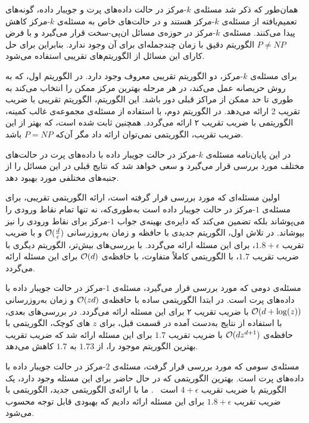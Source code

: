 
همان‌طور که ذکر شد مسئله‌ی $k$-مرکز در حالت داده‌های پرت و جویبار داده، گونه‌های تعمیم‌یافته از مسئله‌ی $k$-مرکز هستند و در حالت‌های خاص به مسئله‌ی $k$-مرکز کاهش پیدا می‌کنند.
مسئله‌ی $k$-مرکز در حوزه‌ی مسائل ان‌پی-سخت قرار می‌گیرد و با فرض $P \neq NP$ الگوریتم دقیق با زمان چندجمله‌ای برای آن وجود ندارد.
بنابراین برای حل کارای این مسائل از الگوریتم‌های تقریبی استفاده می‌شود.

برای مسئله‌ی $k$-مرکز، دو الگوریتم تقریبی معروف وجود دارد.
در الگوریتم اول، که به روش حریصانه عمل می‌کند، در هر مرحله بهترین مرکز ممکن را انتخاب می‌کند به طوری تا حد ممکن از مراکز قبلی دور باشد.
این الگوریتم، الگوریتم تقریبی با ضریب تقریب 2 ارائه می‌دهد.
در الگوریتم دوم، با استفاده از مسئله‌ی مجموعه‌ی غالب کمینه، الگوریتمی با ضریب تقریب ۲ ارائه می‌گردد.
همچنین ثابت شده است، که بهتر از این ضریب تقریب، الگوریتمی نمی‌توان ارائه داد مگر آن‌که $P = NP$ باشد.


در این پایان‌نامه مسئله‌ی $k$-مرکز  در حالت جویبار داده با داده‌های پرت در حالت‌های مختلف مورد بررسی قرار می‌گیرد و سعی خواهد شد که نتایج قبلی در این مسائل را از جنبه‌های مختلفی مورد بهبود دهد.

اولین مسئله‌ای که مورد بررسی قرار گرفته است، ارائه الگوریتمی تقریبی، برای مسئله‌ی $1$-مرکز در حالت جویبار داده است به‌طوری‌که، نه تنها تمام نقاط ورودی را می‌پوشاند بلکه تضمین می‌کند که دایره‌ی بهینه‌ی جواب $1$-مرکز برای نقاط ورودی را نیز بپوشاند.
در تلاش اول، الگوریتم جدیدی با حافظه و زمان به‌روزرسانی $\mathcal{O}(\frac{d}{\epsilon})$ و با ضریب تقریب $1.8 + \epsilon$، برای این مسئله ارائه می‌گردد.
با بررسی‌های بیش‌تر، الگوریتم دیگری با ضریب تقریب $1.7$، با الگوریتمی کاملاً متفاوت، با حافظه‌ی $\mathcal{O}(d)$ برای این مسئله ارائه می‌گردد.

مسئله‌ی دومی که مورد بررسی قرار می‌گیرد، مسئله‌ی $1$-مرکز در حالت جویبار داده با داده‌های پرت است.
در ابتدا الگوریتمی ساده با حافظه‌ی $\mathcal{O}(zd)$ و زمان به‌روزرسانی $\mathcal{O}(d + \log(z))$ با ضریب تقریب ۲ برای این مسئله ارائه می‌گردد.
در بررسی‌های بعدی، با استفاده از نتایج به‌دست آمده در قسمت قبل، برای $z$ های کوچک، الگوریتمی با حافظه‌ی $\mathcal{O}(dz^{d+1})$ با ضریب تقریب $1.7$ برای این مسئله ارائه شد که ضریب تقریب بهترین الگوریتم موجود را، از $1.73$ به $1.7$ کاهش می‌دهد.

مسئله‌ی سومی که مورد بررسی قرار گرفت، مسئله‌ی $2$-مرکز در حالت جویبار داده با داده‌های پرت است.
بهترین الگوریتمی که در حال حاضر برای این مسئله وجود دارد، یک الگوریتم با ضریب تقریب $4 + \epsilon$ است ~.
ما با ارائه‌ی الگوریتمی جدید، الگوریتمی با ضریب تقریب $1.8 + \epsilon$ برای این مسئله ارائه دادیم که بهبودی قابل توجه محسوب می‌شود.
 

